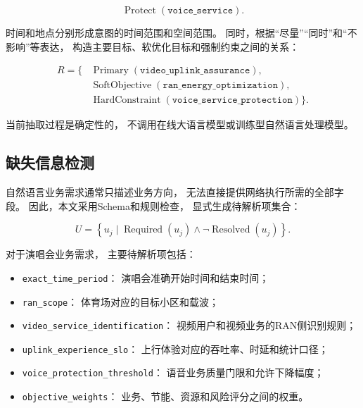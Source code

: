 \documentclass[lang=cn,12pt]{elegantbook}
\begin{document}
\begin{equation}
\operatorname{Protect}
\left(
\texttt{voice\_service}
\right).
\end{equation}

时间和地点分别形成意图的时间范围和空间范围。
同时，根据“尽量”“同时”和“不影响”等表达，
构造主要目标、软优化目标和强制约束之间的关系：

\begin{equation}
\begin{aligned}
R
=
\{
&\operatorname{Primary}
(\texttt{video\_uplink\_assurance}),
\\
&\operatorname{SoftObjective}
(\texttt{ran\_energy\_optimization}),
\\
&\operatorname{HardConstraint}
(\texttt{voice\_service\_protection})
\}.
\end{aligned}
\label{eq:intent_logical_relationship}
\end{equation}

当前抽取过程是确定性的，
不调用在线大语言模型或训练型自然语言处理模型。


\subsection*{缺失信息检测}

自然语言业务需求通常只描述业务方向，
无法直接提供网络执行所需的全部字段。
因此，本文采用Schema和规则检查，
显式生成待解析项集合：

\begin{equation}
U
=
\left\{
u_j
\mid
\operatorname{Required}(u_j)
\land
\neg\operatorname{Resolved}(u_j)
\right\}.
\label{eq:unresolved_item_set}
\end{equation}

对于演唱会业务需求，
主要待解析项包括：

\begin{itemize}
    \item \texttt{exact\_time\_period}：
    演唱会准确开始时间和结束时间；
    \item \texttt{ran\_scope}：
    体育场对应的目标小区和载波；
    \item \texttt{video\_service\_identification}：
    视频用户和视频业务的RAN侧识别规则；
    \item \texttt{uplink\_experience\_slo}：
    上行体验对应的吞吐率、时延和统计口径；
    \item \texttt{voice\_protection\_threshold}：
    语音业务质量门限和允许下降幅度；
    \item \texttt{objective\_weights}：
    业务、节能、资源和风险评分之间的权重。
\end{itemize}
\end{document}
